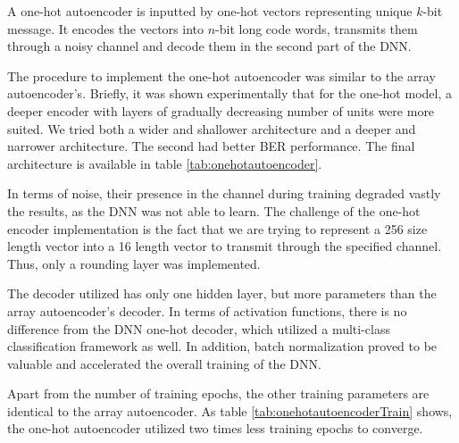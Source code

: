 \documentclass[conference]{IEEEtran}
\begin{document}
A one-hot autoencoder is inputted by one-hot vectors representing  unique $k$-bit message. It encodes the vectors into $n$-bit long code words, transmits them through a noisy channel and decode them in the second part of the DNN. 

The procedure to implement the one-hot autoencoder was similar to the array autoencoder's. Briefly, it was shown experimentally that for the one-hot model, a deeper encoder with layers of gradually decreasing number of units were more suited. We tried both a wider and shallower architecture and a deeper and narrower architecture. The second had better BER performance. The final architecture is available in table \ref{tab:onehotautoencoder}.

In terms of noise, their presence in the channel during training degraded vastly the results, as the DNN was not able to learn. The challenge of the one-hot encoder implementation is the fact that we are trying to represent a 256 size length vector into a 16 length vector to transmit through the specified channel. Thus, only a rounding layer was implemented.

The decoder utilized has only one hidden layer, but more parameters than the array autoencoder's decoder. In terms of activation functions, there is no difference from the DNN one-hot decoder, which utilized a multi-class classification framework as well. In addition, batch normalization proved to be valuable and accelerated the overall training of the DNN.

Apart from the number of training epochs, the other training parameters are identical to the array autoencoder. As table \ref{tab:onehotautoencoderTrain} shows, the one-hot autoencoder utilized two times less training epochs to converge.
\end{document}
